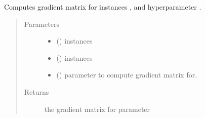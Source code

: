 \documentclass[letterpaper,10pt,english]{sphinxmanual}
\begin{document}
\begin{fulllineitems}
\begin{fulllineitems}
\label{\detokenize{index:bo.covfunc.GammaExponential.grad_matrix}}
Computes gradient matrix for instances ,  and hyperparameter .
\begin{quote}\begin{description}
\item[{Parameters}] \leavevmode\begin{itemize}
\item {} 
 (\sphinxstyleliteralemphasis{, }\sphinxstyleliteralemphasis{(}\sphinxstyleliteralemphasis{(}\sphinxstyleliteralemphasis{, }\sphinxstyleliteralemphasis{)}\sphinxstyleliteralemphasis{)}) \textendash{} instances

\item {} 
 (\sphinxstyleliteralemphasis{, }\sphinxstyleliteralemphasis{(}\sphinxstyleliteralemphasis{(}\sphinxstyleliteralemphasis{, }\sphinxstyleliteralemphasis{)}\sphinxstyleliteralemphasis{)}) \textendash{} instances

\item {} 
 () \textendash{} parameter to compute gradient matrix for.

\end{itemize}

\item[{Returns}] \leavevmode
the gradient matrix for parameter 

\end{description}\end{quote}

\end{fulllineitems}


\end{fulllineitems}

\end{document}
